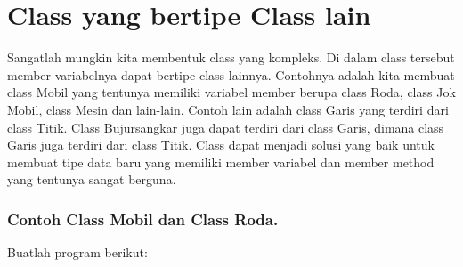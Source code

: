 \section{Class yang bertipe Class
lain}\label{class-yang-bertipe-class-lain}

Sangatlah mungkin kita membentuk class yang kompleks. Di dalam class
tersebut member variabelnya dapat bertipe class lainnya. Contohnya
adalah kita membuat class Mobil yang tentunya memiliki variabel member
berupa class Roda, class Jok Mobil, class Mesin dan lain-lain. Contoh
lain adalah class Garis yang terdiri dari class Titik. Class
Bujursangkar juga dapat terdiri dari class Garis, dimana class Garis
juga terdiri dari class Titik. Class dapat menjadi solusi yang baik
untuk membuat tipe data baru yang memiliki member variabel dan member
method yang tentunya sangat berguna.

\subsubsection*{Contoh  Class Mobil dan Class Roda.}

Buatlah program berikut:

